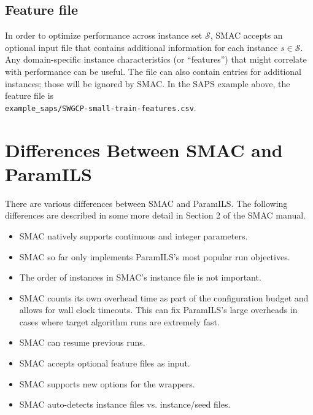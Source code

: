 \documentclass[11pt,letterpaper,twoside]{article}
\begin{document}
\subsection{Feature file}
In order to optimize performance across instance set $\mathcal{S}$, SMAC accepts an optional input file that contains additional information for each instance $s \in \mathcal{S}$. Any domain-specific instance characteristics (or ``features'') that might correlate with performance can be useful. The file can also contain entries for additional instances; those will be ignored by SMAC. 	In the SAPS example above, the feature file is\\ \texttt{example\_saps/SWGCP-small-train-features.csv}.
 
 
\section{Differences Between SMAC and ParamILS}

There are various differences between SMAC and ParamILS. The following differences are described in some more detail in Section 2 of the SMAC manual.

\begin{itemize}
\item SMAC natively supports continuous and integer parameters.
\item SMAC so far only implements ParamILS's most popular run objectives.
\item The order of instances in SMAC's instance file is not important.
\item SMAC counts its own overhead time as part of the configuration budget and allows for wall clock timeouts. This can fix ParamILS's large overheads in cases where target algorithm runs are extremely fast.
\item SMAC can resume previous runs.
\item SMAC accepts optional feature files as input.
\item SMAC supports new options for the wrappers.
\item SMAC auto-detects instance files vs. instance/seed files.
\end{itemize}
 
%

%
%

\footnotesize{
%

}
\end{document}
